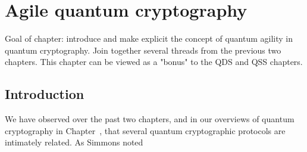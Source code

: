\chapter{Agile quantum cryptography}
Goal of chapter: introduce and make explicit the concept of quantum agility in quantum cryptography. Join together several threads from the previous two chapters. This chapter can be viewed as a "bonus" to the QDS and QSS chapters.

\iffalse
Key things I want to present, in roughly the order that I want to present them:

\begin{itemize}
\item Discussion of agility and why it might be desirable. Motivate it in terms of my two literature reviews.
\item Modification of QDS protocol from earlier to be agile with QSS (i.e. introduce protocol QSS-b and prove its security (inc postselection)). Have some graphs of its behaviour
\item Bring in QKD from the literature (Papanastasiou2018). Have some graphs of its behaviour and discussion of how it relates to my thesis.
\item Talk about the experiment (emphasise that it is not my work). I can have some plots of raw data (opendata), and make graphs of data points which I received.
\item Analysis of the data under each protocol with discussion of how results from previous chapters are modified to make them more realistic
\item Graphs of performance at different data parameters
\item Table from the AQC paper $\leftarrow$ this can be the climax of this section
\item star graph of QDS
\item Discussion of how our analysis motivates agility
\item Outlook/next steps
\end{itemize}
\fi

\section{Introduction}

We have observed over the past two chapters, and in our overviews of quantum cryptography in Chapter~, that several quantum cryptographic protocols are intimately related. As Simmons noted

